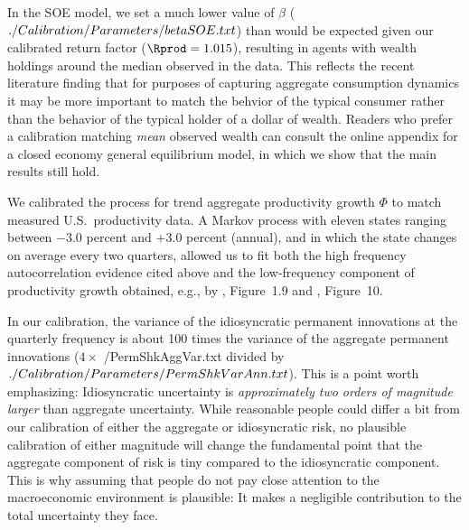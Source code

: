 \documentclass[titlepage]{\econtex}
\let\footnote=\endnote
\begin{document}
In the SOE model, we set a much lower value of $\beta$ ($  ./Calibration/Parameters/betaSOE.txt $) than would be expected given our calibrated return factor (${\Rprod} = 1.015$), resulting in agents with wealth holdings around the median observed in the data.  This reflects the recent literature finding that for purposes of capturing aggregate consumption dynamics it may be more important to match the behvior of the typical consumer rather than the behavior of the typical holder of a dollar of wealth.\footnote{See, for example, \cite{opLiquidH2M}.}  Readers who prefer a calibration matching \textit{mean} observed wealth can consult the online appendix for a closed economy general equilibrium model, in which we show that the main results still hold.

We calibrated the process for trend aggregate productivity growth $\Phi$ to match measured U.S.\ productivity data.  A Markov process with eleven states ranging between $-3.0$ percent and $+3.0$ percent (annual), and in which the state changes on average every two quarters, allowed us to fit both the high frequency autocorrelation evidence cited above and the low-frequency component of productivity growth obtained, e.g., by \cite{sswNAIRU}, Figure~1.9 and \cite{fernald:disappointingRecovery}, Figure~10.

In our calibration, the variance of the idiosyncratic permanent innovations at the quarterly frequency is about 100 times the variance of the aggregate permanent innovations ($4 \times $ \ParmDir/PermShkAggVar.txt divided by $ ./Calibration/Parameters/PermShkVarAnn.txt $).  This is a point worth emphasizing: Idiosyncratic uncertainty is {\it approximately two orders of magnitude larger} than aggregate uncertainty.  While reasonable people could differ a bit from our calibration of either the aggregate or idiosyncratic risk, no plausible calibration of either magnitude will change the fundamental point that the aggregate component of risk is tiny compared to the idiosyncratic component.  This is why assuming that people do not pay close attention to the macroeconomic environment is plausible: It makes a negligible contribution to the total uncertainty they face.

\hypertarget{ConcavityAggImp}{}
\end{document}

